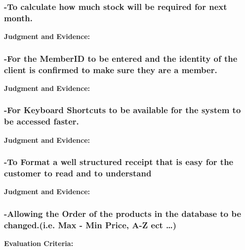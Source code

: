 {\subsubsection{-To calculate how much stock will be required for next month.}

\textbf{Judgment and Evidence:} \newline









\subsubsection{-For the MemberID to be entered and the identity of the client is confirmed to make sure they are a member.}

\textbf{Judgment and Evidence:} \newline








\subsubsection{-For Keyboard Shortcuts to be available for the system to be accessed faster.}

\textbf{Judgment and Evidence:} \newline








\subsubsection{-To Format a well structured receipt that is easy for the customer to read and to understand}

\textbf{Judgment and Evidence:} \newline







\subsubsection{-Allowing the Order of the products in the database to be changed.(i.e. Max - Min Price, A-Z ect \ldots)}\textbf{Evaluation Criteria:} \newline


}
